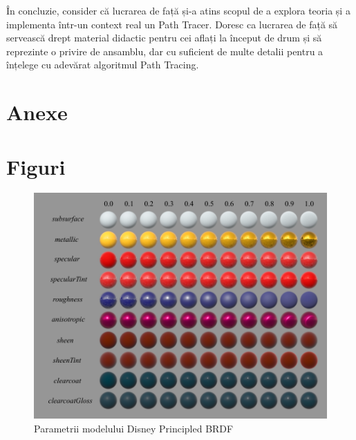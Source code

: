 \documentclass[12pt,a4paper]{report}
\numberwithin{equation}{section} %
\begin{document}
În concluzie, consider că lucrarea de față și-a atins scopul de a explora teoria și
a implementa într-un context real un Path Tracer. Doresc ca lucrarea de față să servească
drept material didactic pentru cei aflați la început de drum și să reprezinte o privire
de ansamblu, dar cu suficient de multe detalii pentru a înțelege cu adevărat algoritmul
Path Tracing. 





\chapter*{Anexe}

\begin{appendices}
	\label{anexa}

	\chapter{Figuri}

	\begin{figure}
		\centering
		\includegraphics[width=\textwidth]{pics/disney_params.png}
		\caption{Parametrii modelului Disney Principled BRDF~\cite{Disney}}
		\label{fig:disney_params}
	\end{figure}


\end{appendices}
\end{document}
